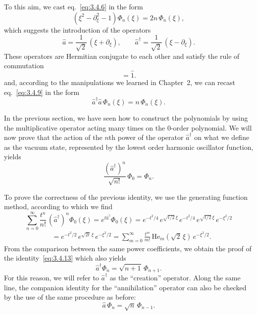 To this aim, we cast eq.~\eqref{eq:3.4.6} in the form
\begin{equation}
\left(\xi^2-\partial_\xi^2-1\right)\Phi_n(\xi)=2n\,\Phi_n(\xi),
\label{eq:3.4.9}
\end{equation}
which suggests the introduction of the operators
\begin{equation}
\hat a=\frac{1}{\sqrt{2}}\,(\xi+\partial_\xi),\qquad
\hat a^\dagger=\frac{1}{\sqrt{2}}\,(\xi-\partial_\xi).
\label{eq:3.4.10}
\end{equation}
These operators are Hermitian conjugate to each other and satisfy the
rule of commutation
\begin{equation}
[\hat a,\hat a^\dagger]=\hat 1.
\label{eq:3.4.11}
\end{equation}
and, according to the manipulations we learned in Chapter~2, we can
recast eq.~\eqref{eq:3.4.9} in the form
\begin{equation}
\hat a^\dagger\hat a\,\Phi_n(\xi)=n\,\Phi_n(\xi).
\label{eq:3.4.12}
\end{equation}

In the previous section, we have seen how to construct the
polynomials by using the multiplicative operator acting many times on
the 0-order polynomial. We will now prove that the action of the
$n$th power of the operator $\hat a^\dagger$ on what we define as
the vacuum state, represented by the lowest order harmonic
oscillator function, yields
\begin{equation}
\frac{(\hat a^\dagger)^n}{\sqrt{n!}}\,\Phi_0=\Phi_n.
\label{eq:3.4.13}
\end{equation}

To prove the correctness of the previous identity, we use the
generating function method, according to which we find
\[
\sum_{n=0}^{\infty}\frac{t^n}{n!}\,(\hat a^\dagger)^n\Phi_0(\xi)
=e^{t\hat a^\dagger}\Phi_0(\xi)
=e^{-t^2/4}\,e^{\sqrt{t/2}\,\xi}\,
 e^{-t^2/4}\,e^{\sqrt{t/2}\,\xi}\,e^{-\xi^2/2}
\]
\begin{align*}
&=e^{-t^2/2}\,e^{\sqrt{2t}\,\xi}\,e^{-\xi^2/2}
 =\sum_{m=0}^{\infty}\frac{t^m}{m!}\,
  \mathrm{He}_m\!\left(\sqrt{2}\,\xi\right)\,e^{-\xi^2/2}.
\tag{3.4.14}
\end{align*}
From the comparison between the same power coefficients, we obtain
the proof of the identity~\eqref{eq:3.4.13} which also yields
\begin{equation}
\hat a^\dagger\Phi_n=\sqrt{n+1}\,\Phi_{n+1}.
\label{eq:3.4.15}
\end{equation}
For this reason, we will refer to $\hat a^\dagger$ as the
``creation'' operator. Along the same line, the companion identity
for the ``annihilation'' operator can also be checked by the use of
the same procedure as before:
\begin{equation}
\hat a\,\Phi_n=\sqrt{n}\,\Phi_{n-1}.
\label{eq:3.4.16}
\end{equation}

